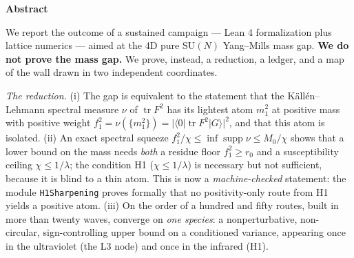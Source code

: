 \documentclass[11pt,a4paper]{article}
\newcommand{\code}[1]{\texttt{\footnotesize #1}}
\begin{document}
\begin{tcolorbox}[enhanced, breakable, colback=white, colframe=white, boxrule=0pt,
  left=6pt, right=6pt, top=4pt, bottom=4pt, parbox=false]
\begin{center}{\large\bfseries Abstract}\end{center}
\footnotesize
\setlength{\parskip}{0pt}
We report the outcome of a sustained campaign --- Lean 4 formalization plus lattice numerics ---
aimed at the 4D pure $\mathrm{SU}(N)$ Yang--Mills mass gap. \textbf{We do not prove the mass
gap.} We prove, instead, a reduction, a ledger, and a map of the wall drawn in two independent
coordinates.

\emph{The reduction.} (i) The gap is equivalent to the statement that the K\"all\'en--Lehmann
spectral measure $\nu$ of $\operatorname{tr}F^2$ has its lightest atom $m_1^2$ at positive mass
with positive weight $f_1^2=\nu(\{m_1^2\})=|\langle0|\operatorname{tr}F^2|G\rangle|^2$, and that
this atom is isolated. (ii) An exact spectral squeeze
$f_1^2/\chi\le\inf\operatorname{supp}\nu\le M_0/\chi$ shows that a lower bound on the mass needs
\emph{both} a residue floor $f_1^2\ge r_0$ and a susceptibility ceiling $\chi\le1/\lambda$; the
condition H1 ($\chi\le1/\lambda$) is necessary but not sufficient, because it is blind to a thin
atom. This is now a \emph{machine-checked} statement: the module \code{H1Sharpening} proves
formally that no positivity-only route from H1 yields a positive atom. (iii) On the order of a
hundred and fifty routes, built in more than twenty waves, converge on \emph{one species}: a
nonperturbative, non-circular, sign-controlling upper bound on a conditioned variance, appearing
once in the ultraviolet (the L3 node) and once in the infrared (H1).


\end{tcolorbox}
\end{document}
